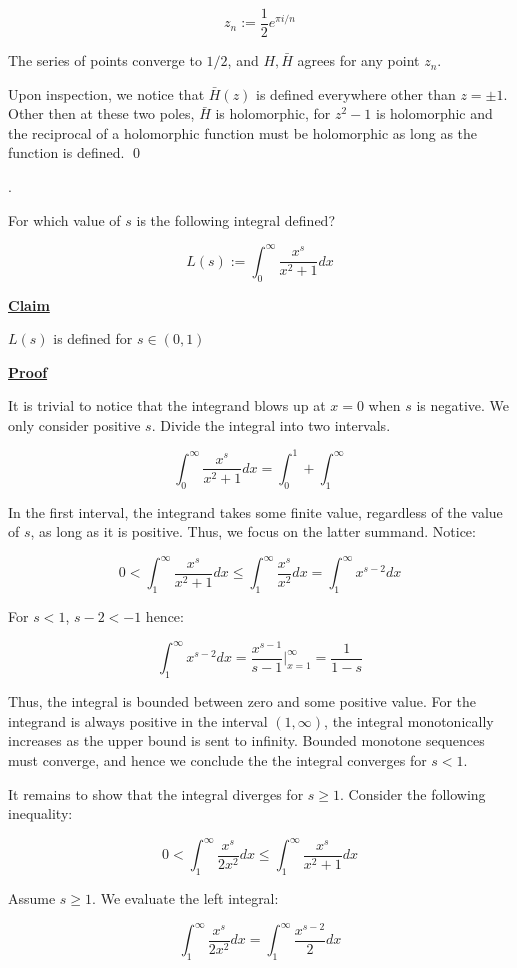 \documentclass{article}
\newcommand{\new}[1]{
    \vspace{2mm}
    \noindent
    \textbf{
    \underline{#1}}
}
\newcounter{problemcnt}
\newcommand{\Problem}{{
    \vspace{5mm}
    \stepcounter{problemcnt}
    \noindent
    \arabic{problemcnt}. 
}
}
\newcommand{\Proof}{{
    \vspace{2mm}
    \noindent
    \textbf{
    \underline{Proof}}
}
}
\begin{document}
\[
    z_n := \frac{1}{2}e^{\pi i / n}
\]

The series of points converge to $1/2$, and $H, \bar{H}$ agrees 
for any point $z_n$.

Upon inspection, we notice that $\bar{H}(z)$ is defined everywhere 
other than $z = \pm 1$. Other then at these two poles, 
$\bar{H}$ is holomorphic, for $z^2-1$ is holomorphic and the 
reciprocal of a holomorphic function must be holomorphic as long 
as the function is defined. 
\qed


\newpage
\Problem
For which value of $s$ is the following 
integral defined?

\[
    L(s):= 
    \int_{0}^\infty \frac{x^s }{x^2+1}dx
\]

\new{Claim}
$L(s)$ is defined for $s \in (0, 1)$

\Proof
It is trivial to notice that the integrand blows up at $x = 0$ 
when $s$ is negative. We only consider positive $s$. Divide 
the integral into two intervals. 

\[
    \int_{0}^\infty \frac{x^s }{x^2+1}dx
    = \int_{0}^1+\int_1^\infty
\]

In the first interval, the integrand takes some finite 
value, regardless of the value of $s$, as long as it is positive. 
Thus, we focus on the latter summand. Notice:

\[
    0<
    \int_{1}^\infty \frac{x^s }{x^2+1}dx \leq
    \int_{1}^\infty \frac{x^s }{x^2}dx
    =
    \int_{1}^\infty  x^{s-2}dx
\]

For $s < 1$, $s-2 < -1$ hence:

\[
    \int_{1}^\infty  x^{s-2}dx
    = \frac{x^{s-1}}{s-1}\bigg|_{x = 1}^\infty = \frac{1}{1-s}
\]

Thus, the integral is bounded between zero and some positive value. 
For the integrand is always positive in the interval $(1, \infty)$,
the integral monotonically increases as the upper bound is sent 
to infinity. Bounded monotone sequences must converge, and hence 
we conclude the the integral converges for $s<1$. 

It remains to show that the integral diverges for $s\geq 1$. 
Consider the following inequality:

\[
    0<
    \int_{1}^\infty \frac{x^s }{2x^2}dx \leq
    \int_{1}^\infty \frac{x^s }{x^2+1}dx
\]

Assume $s \geq 1$. We evaluate the left integral:

\[
    \int_{1}^\infty \frac{x^s }{2x^2}dx =
    \int_{1}^\infty \frac{x^{s-2}}{2}dx
\]
\end{document}
